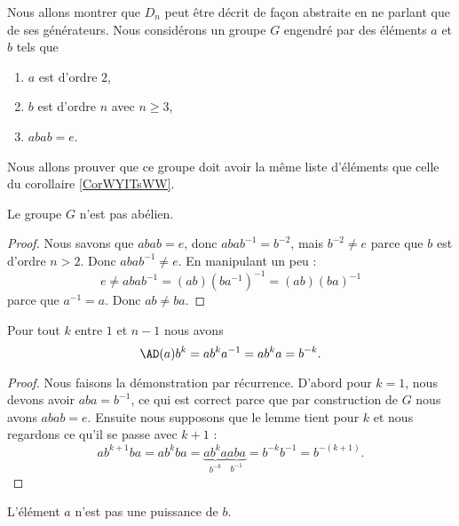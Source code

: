 Nous allons montrer que \( D_n\) peut être décrit de façon abstraite en ne parlant que de ses générateurs. Nous considérons un groupe \( G\) engendré par des éléments \( a\) et \( b\) tels que
\begin{enumerate}
    \item
        \( a\) est d'ordre \( 2\),
    \item
        \( b\) est d'ordre \( n\) avec \( n\geq 3\),
    \item
        \( abab=e\).
\end{enumerate}
Nous allons prouver que ce groupe doit avoir la même liste d'éléments que celle du corollaire \ref{CorWYITsWW}.

\begin{proposition}
    Le groupe \( G\) n'est pas abélien.
\end{proposition}

\begin{proof}
    Nous savons que \( abab=e\), donc \( abab^{-1}=b^{-2}\), mais \( b^{-2}\neq e\) parce que \( b\) est d'ordre \( n>2\). Donc \( abab^{-1}\neq e\). En manipulant un peu :
    \begin{equation}
        e\neq abab^{-1}=(ab)(ba^{-1})^{-1}=(ab)(ba)^{-1}
    \end{equation}
    parce que \( a^{-1}=a\). Donc \( ab\neq ba\).
\end{proof}

\begin{lemma}        \label{LemKKXdqdL}
    Pour tout \( k\) entre \( 1\) et \( n-1\) nous avons
    \begin{equation}
        \AD(a)b^k=ab^ka^{-1}=ab^ka=b^{-k}.
    \end{equation}
\end{lemma}

\begin{proof}
    Nous faisons la démonstration par récurrence. D'abord pour \( k=1\), nous devons avoir \( aba=b^{-1}\), ce qui est correct parce que par construction de \( G\) nous avons \( abab=e\). Ensuite nous supposons que le lemme tient pour \( k\) et nous regardons ce qu'il se passe avec \( k+1\) :
    \begin{equation}
            ab^{k+1}ba=ab^kba=\underbrace{ab^ka}_{b^{-k}}\underbrace{aba}_{b^{-1}}=b^{-k}b^{-1}=b^{-(k+1)}.
    \end{equation}
\end{proof}

\begin{proposition}     \label{PROPooVQARooWuKHMZ}
    L'élément \( a\) n'est pas une puissance de \( b\).
\end{proposition}

